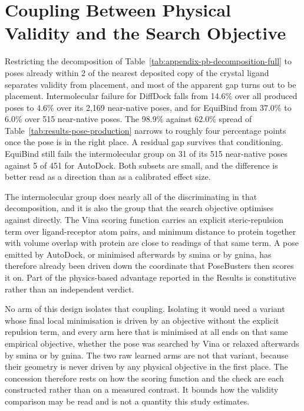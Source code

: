 \hypertarget{validity-objective-coupling}{%
\section{Coupling Between Physical Validity and the Search Objective}\label{validity-objective-coupling}}

Restricting the decomposition of Table~\ref{tab:appendix-pb-decomposition-full} to poses already within 2\angstrom{} of the nearest deposited copy of the crystal ligand separates validity from placement, and most of the apparent gap turns out to be placement. Intermolecular failure for DiffDock falls from 14.6\% over all produced poses to 4.6\% over its 2,169 near-native poses, and for EquiBind from 37.0\% to 6.0\% over 515 near-native poses. The 98.9\% against 62.0\% spread of Table~\ref{tab:results-pose-production} narrows to roughly four percentage points once the pose is in the right place. A residual gap survives that conditioning. EquiBind still fails the intermolecular group on 31 of its 515 near-native poses against 5 of 451 for AutoDock. Both subsets are small, and the difference is better read as a direction than as a calibrated effect size.

The intermolecular group does nearly all of the discriminating in that decomposition, and it is also the group that the search objective optimises against directly. The Vina scoring function carries an explicit steric-repulsion term over ligand-receptor atom pairs, and minimum distance to protein together with volume overlap with protein are close to readings of that same term. A pose emitted by AutoDock, or minimised afterwards by smina or by gnina, has therefore already been driven down the coordinate that PoseBusters then scores it on. Part of the physics-based advantage reported in the Results is constitutive rather than an independent verdict.

No arm of this design isolates that coupling. Isolating it would need a variant whose final local minimisation is driven by an objective without the explicit repulsion term, and every arm here that is minimised at all ends on that same empirical objective, whether the pose was searched by Vina or relaxed afterwards by smina or by gnina. The two raw learned arms are not that variant, because their geometry is never driven by any physical objective in the first place. The concession therefore rests on how the scoring function and the check are each constructed rather than on a measured contrast. It bounds how the validity comparison may be read and is not a quantity this study estimates.

